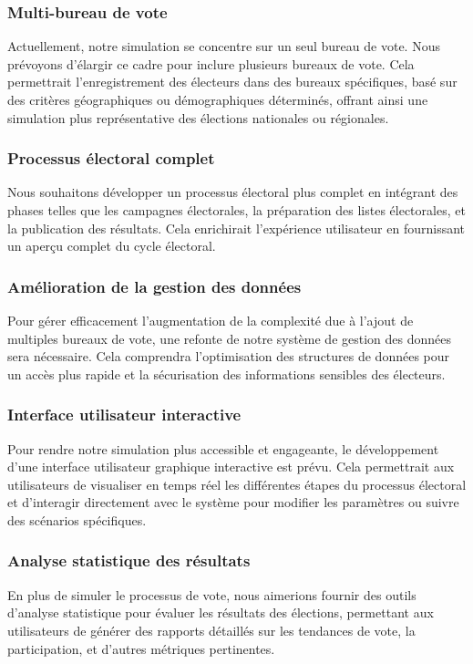 \documentclass[12pt]{article} %
\begin{document}
	\subsubsection*{Multi-bureau de vote}
	Actuellement, notre simulation se concentre sur un seul bureau de vote. Nous prévoyons d'élargir ce cadre pour inclure plusieurs bureaux de vote. Cela permettrait l'enregistrement des électeurs dans des bureaux spécifiques, basé sur des critères géographiques ou démographiques déterminés, offrant ainsi une simulation plus représentative des élections nationales ou régionales.
	
	\subsubsection*{Processus électoral complet}
	Nous souhaitons développer un processus électoral plus complet en intégrant des phases telles que les campagnes électorales, la préparation des listes électorales, et la publication des résultats. Cela enrichirait l'expérience utilisateur en fournissant un aperçu complet du cycle électoral.
	
	\subsubsection*{Amélioration de la gestion des données}
	Pour gérer efficacement l'augmentation de la complexité due à l'ajout de multiples bureaux de vote, une refonte de notre système de gestion des données sera nécessaire. Cela comprendra l'optimisation des structures de données pour un accès plus rapide et la sécurisation des informations sensibles des électeurs.
	
	\subsubsection*{Interface utilisateur interactive}
	Pour rendre notre simulation plus accessible et engageante, le développement d'une interface utilisateur graphique interactive est prévu. Cela permettrait aux utilisateurs de visualiser en temps réel les différentes étapes du processus électoral et d'interagir directement avec le système pour modifier les paramètres ou suivre des scénarios spécifiques.
	
	\subsubsection*{Analyse statistique des résultats}
	En plus de simuler le processus de vote, nous aimerions fournir des outils d'analyse statistique pour évaluer les résultats des élections, permettant aux utilisateurs de générer des rapports détaillés sur les tendances de vote, la participation, et d'autres métriques pertinentes.
	
\end{document}
